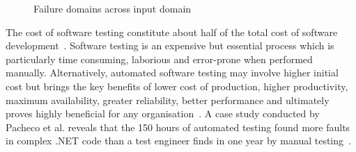 \smallskip
\begin{figure} [H]
\centering
{}
\smallskip
\caption{Failure domains across input domain~\cite{chan1996proportional}}
\label{fig:patterns}
\end{figure} 


The cost of software testing constitute about half of the total cost of software development~\cite{myers2011art}. Software testing is an expensive but essential process which is particularly time consuming, laborious and error-prone when performed manually. Alternatively, automated software testing may involve higher initial cost but brings the key benefits of lower cost of production, higher productivity, maximum availability, greater reliability, better performance and ultimately proves highly beneficial for any organisation~\cite{beizer2003software}. A case study conducted by Pacheco et al. reveals that the 150 hours of automated testing found more faults in complex .NET code than a test engineer finds in one year by manual testing~\cite{pacheco2008finding}.

